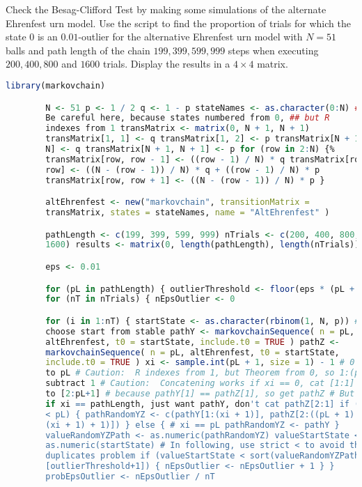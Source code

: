 \documentclass[12pt]{article}
\begin{document}
\begin{exercise}
    Check the Besag-Clifford Test by making some simulations of the
    alternate Ehrenfest urn model.  Use the script to find the
    proportion of trials for which the state \( 0 \) is an \( 0.01 \)-outlier
    for the alternative Ehrenfest urn model with \( N = 51 \) balls and
    path length of the chain \( 199, 399, 599, 999 \) steps when
    executing \( 200, 400, 800 \) and \( 1600 \) trials.  Display the
    results in a \( 4 \times 4 \) matrix.
\end{exercise}
\begin{solution}
    \begin{lstlisting}[language=R]
        library(markovchain)

        N <- 51 p <- 1 / 2 q <- 1 - p stateNames <- as.character(0:N) ##
        Be careful here, because states numbered from 0, ## but R
        indexes from 1 transMatrix <- matrix(0, N + 1, N + 1)
        transMatrix[1, 1] <- q transMatrix[1, 2] <- p transMatrix[N + 1,
        N] <- q transMatrix[N + 1, N + 1] <- p for (row in 2:N) {%
        transMatrix[row, row - 1] <- ((row - 1) / N) * q transMatrix[row,
        row] <- ((N - (row - 1)) / N) * q + ((row - 1) / N) * p
        transMatrix[row, row + 1] <- ((N - (row - 1)) / N) * p }

        altEhrenfest <- new("markovchain", transitionMatrix =
        transMatrix, states = stateNames, name = "AltEhrenfest" )

        pathLength <- c(199, 399, 599, 999) nTrials <- c(200, 400, 800,
        1600) results <- matrix(0, length(pathLength), length(nTrials))

        eps <- 0.01

        for (pL in pathLength) { outlierThreshold <- floor(eps * (pL + 1))
        for (nT in nTrials) { nEpsOutlier <- 0

        for (i in 1:nT) { startState <- as.character(rbinom(1, N, p)) #
        choose start from stable pathY <- markovchainSequence( n = pL,
        altEhrenfest, t0 = startState, include.t0 = TRUE ) pathZ <-
        markovchainSequence( n = pL, altEhrenfest, t0 = startState,
        include.t0 = TRUE ) xi <- sample.int(pL + 1, size = 1) - 1 # 0
        to pL # Caution:  R indexes from 1, but Theorem from 0, so 1:(pL+1),
        subtract 1 # Caution:  Concatening works if xi == 0, cat [1:1]
        to [2:pL+1] # because pathY[1] == pathZ[1], so get pathZ # But
        if xi == pathLength, just want pathY, don't cat pathZ[2:1] if (xi
        < pL) { pathRandomYZ <- c(pathY[1:(xi + 1)], pathZ[2:((pL + 1) -
        (xi + 1) + 1)]) } else { # xi == pL pathRandomYZ <- pathY }
        valueRandomYZPath <- as.numeric(pathRandomYZ) valueStartState <-
        as.numeric(startState) # In following, use strict < to avoid the
        duplicates problem if (valueStartState < sort(valueRandomYZPath)
        [outlierThreshold+1]) { nEpsOutlier <- nEpsOutlier + 1 } }
        probEpsOutlier <- nEpsOutlier / nT


\end{lstlisting}
\end{solution}
\end{document}
